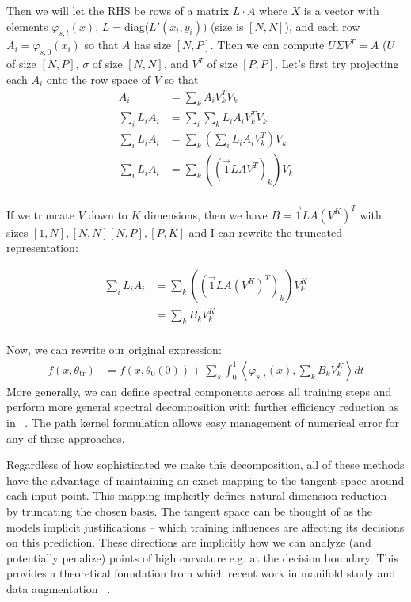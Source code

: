 Then we will let the RHS be rows of a matrix $L \cdot A$ where $X$ is a vector with elements $\varphi_{s,t}(x)$, $L =
$diag($L'(x_i, y_i))$ (size is $[N, N]$), and each row $A_i
= \varphi_{s,0}(x_i)$ so that $A$ has size $[N, P]$. Then we can compute $U\Sigma V^T =
A$ ($U$ of size $[N, P]$, $\sigma$ of size $[N, N]$, and $V^T$ of size $[P, P]$. Let's first try projecting each $A_i$ onto the row space of $V$ so that 
\begin{align}
    A_i &= \sum_k A_i V_k^T V_k \\
    \sum_i L_i A_i &= \sum_i \sum_k L_i A_i V_k^T V_k\\
    \sum_i L_i A_i &= \sum_k \left(\sum_i L_i A_i V_k^T\right) V_k\\
    \sum_i L_i A_i &= \sum_k \left((\vec 1 L A V^T)_k\right) V_k\\
\end{align}

If we truncate  $V$ down to $K$ dimensions, then we have $B = \vec 1 L A (V^K)^T$ with sizes $[1,N], [N,N][N,P],[P,K]$ and I can rewrite the truncated representation:

\begin{align}
    \sum_i L_i A_i &= \sum_k \left((\vec 1 L A (V^K)^T)_k\right) V^K_k\\
    &= \sum_k B_k V^K_k\\
\end{align}

Now, we can rewrite our original expression:
\begin{align}
     f(x, \theta_\text{tr}) &= f(x, \theta_0(0)) +  \sum_s
\int_0^1                                  \left\langle 
                                   \varphi_{s,t}(x) ,  \sum_k B_k V^K_k \right \rangle dt
 \end{align}
More
generally, we can define spectral components across all training steps
and perform more general spectral decomposition with further
efficiency reduction as in ~\citet{tancik2020fourierfeatures}. The path kernel
formulation allows easy management of numerical error for any of these
approaches. 

Regardless of how sophisticated we make this decomposition, all of
these methods have the advantage of maintaining an exact mapping to
the tangent space around each input point. This mapping implicitly
defines natural dimension reduction -- by truncating the chosen
basis. The tangent space can be thought of as the models implicit
justifications -- which training influences are affecting its
decisions on this prediction. These directions are implicitly how we
can analyze (and potentially penalize) points of high curvature
e.g. at the decision boundary. This provides a theoretical foundation
from which recent work in manifold study and data augmentation
~\citep{kaufman_data_2023, liu_linear_2023, sipka_differentiable_2023,
  cha_orthogonality-enforced_2023, marbut_reliable_2023,
  gao_out--domain_2023, oh_provable_2023, chen2023aware}.


